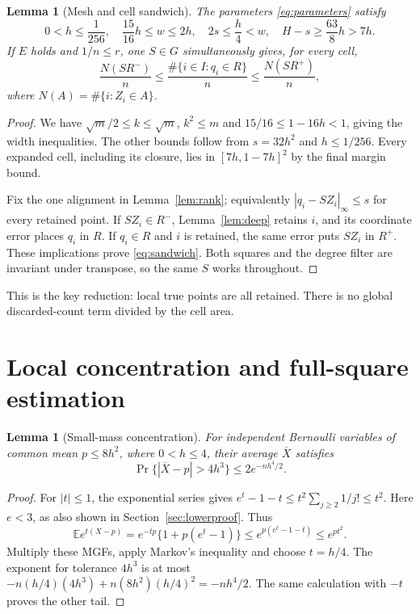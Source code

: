 \documentclass[11pt]{article}
\newtheorem{lemma}[theorem]{Lemma}
\theoremstyle{remark}
\begin{document}
\begin{lemma}[Mesh and cell sandwich]\label{lem:sandwich}
The parameters \eqref{eq:parameters} satisfy
\begin{equation}\label{eq:mesh}
 0<h\le\frac1{256},\quad \frac{15}{16}h\le w\le2h,\quad
 2s\le\frac h4<w,\quad H-s\ge\frac{63}8h>7h.
\end{equation}
If $E$ holds and $1/n\le r$, one $S\in G$ simultaneously gives,
for every cell,
\begin{equation}\label{eq:sandwich}
 \frac{N(SR^-)}n\le
 \frac{\#\{i\in I:q_i\in R\}}n\le
 \frac{N(SR^+)}n,
\end{equation}
where $N(A)=\#\{i:Z_i\in A\}$.
\end{lemma}
\begin{proof}
We have $\sqrt m/2\le k\le\sqrt m$, $k^2\le m$ and
$15/16\le1-16h<1$, giving the width inequalities.
The other bounds follow from $s=32h^2$ and $h\le1/256$.
Every expanded cell, including its closure, lies in
$[7h,1-7h]^2$ by the final margin bound.

Fix the one alignment in Lemma~\ref{lem:rank}; equivalently
$|q_i-SZ_i|_\infty\le s$ for every retained point.
If $SZ_i\in R^-$, Lemma~\ref{lem:deep} retains $i$, and its coordinate
error places $q_i$ in $R$. If $q_i\in R$ and $i$ is retained, the same
error puts $SZ_i$ in $R^+$. These implications prove
\eqref{eq:sandwich}. Both squares and the degree filter are invariant
under transpose, so the same $S$ works throughout.
\end{proof}
This is the key reduction: local true points are all retained.
There is no global discarded-count term divided by the cell area.

\section{Local concentration and full-square estimation}
\label{sec:upperproof}
\begin{lemma}[Small-mass concentration]\label{lem:concentration}
For independent Bernoulli variables of common mean $p\le8h^2$,
where $0<h\le4$, their average $\overline X$ satisfies
\begin{equation}\label{eq:chernoff}
 \Pr\{|\overline X-p|>4h^3\}\le2e^{-nh^4/2}.
\end{equation}
\end{lemma}
\begin{proof}
For $|t|\le1$, the exponential series gives
$e^t-1-t\le t^2\sum_{j\ge2}1/j!\le t^2$.
Here $e<3$, as also shown in Section~\ref{sec:lowerproof}.
Thus
\[
 \mathbb E e^{t(X-p)}
 =e^{-tp}\{1+p(e^t-1)\}
 \le e^{p(e^t-1-t)}\le e^{pt^2}.
\]
Multiply these MGFs, apply Markov's inequality and choose $t=h/4$.
The exponent for tolerance $4h^3$ is at most
$-n(h/4)(4h^3)+n(8h^2)(h/4)^2=-nh^4/2$.
The same calculation with $-t$ proves the other tail.
\end{proof}
\end{document}
